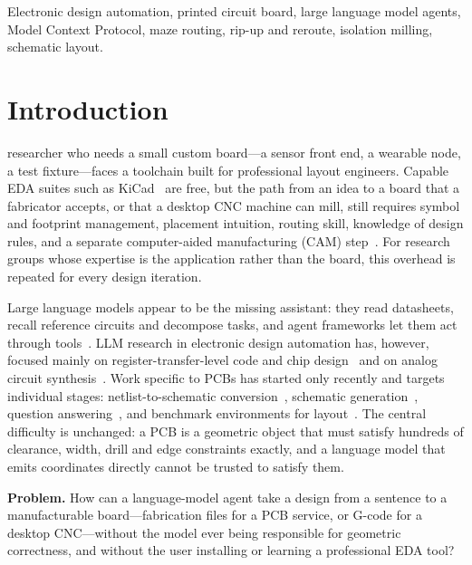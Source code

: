 \documentclass[journal]{IEEEtran}
\begin{document}
\begin{IEEEkeywords}
Electronic design automation, printed circuit board, large language model agents, Model Context Protocol, maze routing, rip-up and reroute, isolation milling, schematic layout.
\end{IEEEkeywords}

\section{Introduction}
 researcher who needs a small custom board---a sensor front end, a wearable node, a test fixture---faces a toolchain built for professional layout engineers. Capable EDA suites such as KiCad~\cite{kicad} are free, but the path from an idea to a board that a fabricator accepts, or that a desktop CNC machine can mill, still requires symbol and footprint management, placement intuition, routing skill, knowledge of design rules, and a separate computer-aided manufacturing (CAM) step~\cite{flatcam,pcb2gcode}. For research groups whose expertise is the application rather than the board, this overhead is repeated for every design iteration.

Large language models appear to be the missing assistant: they read datasheets, recall reference circuits and decompose tasks, and agent frameworks let them act through tools~\cite{yao2023react,schick2023toolformer}. LLM research in electronic design automation has, however, focused mainly on register-transfer-level code and chip design~\cite{chang2023chipgpt,thakur2024verigen,liu2023chipnemo,blocklove2023chipchat,zhong2023llm4eda,pan2025survey} and on analog circuit synthesis~\cite{lai2025analogcoder}. Work specific to PCBs has started only recently and targets individual stages: netlist-to-schematic conversion~\cite{matsuo2025schemato}, schematic generation~\cite{luo2026schgen}, question answering~\cite{srinivasan2026pcbqa}, and benchmark environments for layout~\cite{song2026pcbworld,lu2026omnilayout}. The central difficulty is unchanged: a PCB is a geometric object that must satisfy hundreds of clearance, width, drill and edge constraints exactly, and a language model that emits coordinates directly cannot be trusted to satisfy them.

\textbf{Problem.} How can a language-model agent take a design from a sentence to a manufacturable board---fabrication files for a PCB service, or G-code for a desktop CNC---without the model ever being responsible for geometric correctness, and without the user installing or learning a professional EDA tool?
\end{document}
